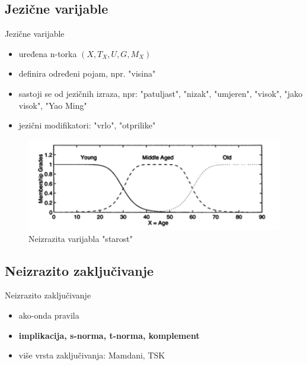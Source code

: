 \documentclass{beamer}
\begin{document}
\subsection{Jezične varijable}

\begin{frame}{Jezične varijable}
\begin{itemize}
  \item uređena n-torka $(X, T_X, U, G, M_X)$
  \item definira određeni pojam, npr. "visina"
  \item sastoji se od jezičnih izraza, npr: "patuljast", "nizak", "umjeren", "visok", "jako visok", "Yao Ming"
  \item jezični modifikatori: "vrlo", "otprilike"
\end{itemize}
\end{frame}

\begin{frame}{}
\begin{figure}[h]
  \includegraphics[width=\textwidth]{img/fuzzy_var.png}
  \caption{Neizrazita varijabla "starost"}
\end{figure}
\end{frame}

\subsection{Neizrazito zaključivanje}
\begin{frame}{Neizrazito zaključivanje}

\begin{itemize}
  \item ako-onda pravila
  \item \textbf{implikacija, s-norma, t-norma, komplement}
  \item više vrsta zaključivanja: Mamdani, TSK
\end{itemize}
\end{frame}
\end{document}
